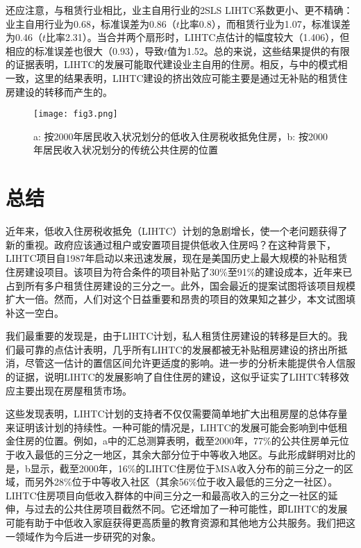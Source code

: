 \documentclass[lang=cn,11pt,a4paper]{paper}
\begin{document}
还应注意，与租赁行业相比，业主自用行业的2SLS LIHTC系数更小、更不精确：业主自用行业为0.68，标准误差为0.86（$t$比率0.8），而租赁行业为1.07，标准误差为0.46（$t$比率2.31）。当合并两个扇形时，LIHTC点估计的幅度较大（1.406），但相应的标准误差也很大（0.93），导致$t$值为1.52。总的来说，这些结果提供的有限的证据表明，LIHTC的发展可能取代建设业主自用的住房。相反，与中的模式相一致，这里的结果表明，LIHTC建设的挤出效应可能主要是通过无补贴的租赁住房建设的转移而产生的。

\begin{figure}[t]
	\centering
	\texttt{[image: fig3.png]}
  \caption{a: 按2000年居民收入状况划分的低收入住房税收抵免住房，b: 按2000年居民收入状况划分的传统公共住房的位置}\label{fig3}
\end{figure}

\section{总结}\label{sec6}

近年来，低收入住房税收抵免（LIHTC）计划的急剧增长，使一个老问题获得了新的重视。政府应该通过租户或安置项目提供低收入住房吗？在这种背景下，LIHTC项目自1987年启动以来迅速发展，现在是美国历史上最大规模的补贴租赁住房建设项目。该项目为符合条件的项目补贴了30\%至91\%的建设成本，近年来已占到所有多户租赁住房建设的三分之一。此外，国会最近的提案试图将该项目规模扩大一倍。然而，人们对这个日益重要和昂贵的项目的效果知之甚少，本文试图填补这一空白。

我们最重要的发现是，由于LIHTC计划，私人租赁住房建设的转移是巨大的。我们最可靠的点估计表明，几乎所有LIHTC的发展都被无补贴租房建设的挤出所抵消，尽管这一估计的置信区间允许更适度的影响。进一步的分析未能提供令人信服的证据，说明LIHTC的发展影响了自住住房的建设，这似乎证实了LIHTC转移效应主要出现在房屋租赁市场。

这些发现表明，LIHTC计划的支持者不仅仅需要简单地扩大出租房屋的总体存量来证明该计划的持续性。一种可能的情况是，LIHTC的发展可能会影响到中低租金住房的位置。例如，a中的汇总测算表明，截至2000年，77\%的公共住房单元位于收入最低的三分之一地区，其余大部分位于中等收入地区。与此形成鲜明对比的是，b显示，截至2000年，16\%的LIHTC住房位于MSA收入分布的前三分之一的区域，而另外28\%位于中等收入社区（其余56\%位于收入最低的三分之一社区）。LIHTC住房项目向低收入群体的中间三分之一和最高收入的三分之一社区的延伸，与过去的公共住房项目截然不同。它还增加了一种可能性，即LIHTC的发展可能有助于中低收入家庭获得更高质量的教育资源和其他地方公共服务。我们把这一领域作为今后进一步研究的对象。
\end{document}
